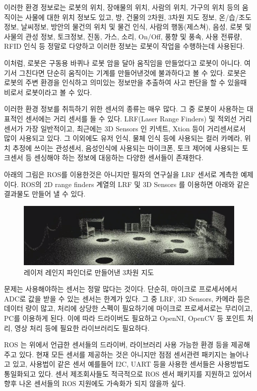 이러한 환경 정보로는 로봇의 위치, 장애물의 위치, 사람의 위치, 가구의 위치 등의 움직이는 사물에 대한 위치 정보도 있고, 방, 건물의 2차원, 3차원 지도 정보, 온/습/조도 정보, 날씨정보, 방안의 물건의 위치 및 물건 인식, 사람의 행동(제스쳐), 음성, 로봇 및 사물의 관성 정보, 토크정보, 진동, 가스, 소리, On/Off, 풍향 및 풍속, 사용 전류량, RFID 인식 등 정말로 다양하고 이러한 정보는 로봇이 작업을 수행하는데 사용된다.

이처럼, 로봇은 구동용 바퀴나 로봇 암을 달아 움직임을 만들었다고 로봇이 아니다. 여기서 그친다면 단순히 움직이는 기계를 만들어낸것에 불과하다고 볼 수 있다. 로봇은 로봇의 주변 환경을 인식하고 의미있는 정보만을 추출하여 사고 판단을 할 수 있을때 비로서 로봇이라고 볼 수 있다. 

이러한 환경 정보를 취득하기 위한 센서의 종류는 매우 많다. 그 중 로봇이 사용하는 대표적인 센서에는 거리 센서를 들 수 있다. LRF(Laser Range Finders) 및 적외선 거리센서가 가장 일반적이고, 최근에는 3D Sensors 인 키넥트, Xtion 등이 거리센서로서 많이 사용되고 있다. 그 이외에도 유저 인식, 물체 인식 등에 사용되는 컬러 카메라, 위치 추정에 쓰이는 관성센서, 음성인식에 사용되는 마이크폰, 토크 제어에 사용되는 토크센서 등 센싱해야 하는 정보에 대응하는 다양한 센서들이 존재한다.

아래의 그림은 ROS를 이용한것은 아니지만 필자의 연구실을 LRF 센서로 계측한 예제이다. ROS의 2D range finders 계열의 LRF 및 3D Sensors 를 이용하면 아래와 같은 결과물도 만들어 낼 수 있다.

\begin{figure}[h]
\centering\includegraphics[width=\columnwidth]{pictures/chapter8/lrf360.png}
\caption{레이저 레인지 파인더로 만들어낸 3차원 지도}
\end{figure}

문제는 사용해야하는 센서는 정말 많다는 것이다. 단순히, 마이크로 프로세서에서 ADC로 값을 받을 수 있는 센서는 한계가 있다. 그 중 LRF, 3D Sensors, 카메라 등은 데이터 량이 많고, 처리에 상당한 스펙이 필요하기에 마이크로 프로세서로는 무리이고, PC를 이용하게 된다. 이에 따라 드라이버도 필요하고 OpenNI, OpenCV 등 포인트 처리, 영상 처리 등에 필요한 라이브러리도 필요하다.

ROS 는 위에서 언급한 센서들의 드라이버, 라이브러리 사용 가능한 환경 등을 제공해주고 있다. 현재 모든 센서를 제공하는 것은 아니지만 점점 센서관련 패키지는 늘어나고 있고, 사용법이 같은 센서 예를들어 I2C, UART 등을 사용한 센서들은 사용방법도 통일화되고 있다. 센서 제조회사들도 적극적으로 ROS 센서 패키지를 지원하고 있어서 향후 나온 센서들의 ROS 지원에도 가속화가 되지 않을까 싶다.

